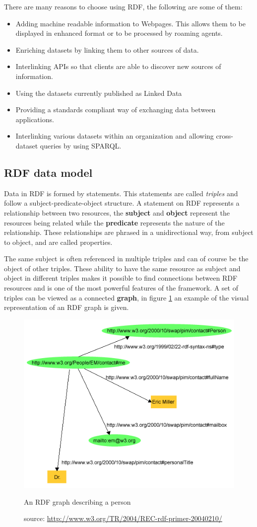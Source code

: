 There are many reasons to choose using RDF, the following are some of them:

\begin{itemize}
	\item Adding machine readable information to Webpages. This allows them to be displayed in enhanced format or to be processed by roaming agents.
	\item Enriching datasets by linking them to other sources of data.
	\item Interlinking APIs so that clients are able to discover new sources of information.
	\item Using the datasets currently published as Linked Data 
	\item Providing a standards compliant way of exchanging data between applications.
	\item Interlinking various datasets within an organization and allowing cross-dataset queries by using SPARQL.
\end{itemize}

\subsection*{RDF data model}

Data in RDF is formed by statements. This statements are called \textit{triples} and follow a subject-predicate-object structure. A statement on RDF represents a relationship between two resources, the \textbf{subject} and \textbf{object} represent the resources being related while the \textbf{predicate} represents the nature of the relationship. These relationships are phrased in a unidirectional way, from subject to object, and are called properties.

The same subject is often referenced in multiple triples and can of course be the object of other triples. These ability to have the same resource as subject and object in different triples makes it possible to find connections between RDF resources and is one of the most powerful features of the framework. A set of triples can be viewed as a connected \textbf{graph}, in figure \ref{fig:rdfgraph} an example of the visual representation of an RDF graph is given.

\begin{figure}[h]
  \centering
  \includegraphics[width=.5\textwidth]{fig/rdfgraph}
  \caption{An RDF graph describing a person}
  \caption*{source: \url{http://www.w3.org/TR/2004/REC-rdf-primer-20040210/}}
  \label{fig:rdfgraph}
\end{figure} 

